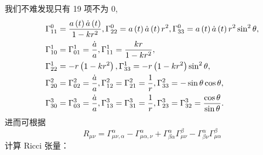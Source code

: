 \documentclass[../天体物理基础.tex]{subfiles}
\begin{document}
我们不难发现只有 19 项不为 0,
\begin{align}
\Gamma_{11}^{0}&=\frac{a\left(t\right)\dot{a}\left(t\right)}{1-kr^{2}},\Gamma_{22}^{0}=a\left(t\right)\dot{a}\left(t\right)r^{2},\Gamma_{33}^{0}=a\left(t\right)\dot{a}\left(t\right)r^{2}\sin^{2}\theta,\notag\\
\Gamma_{10}^{1}&=\Gamma_{01}^{1}=\frac{\dot a}{a},\Gamma_{11}^{1}=\frac{kr}{1-kr^{2}},\notag\\
\Gamma_{22}^{1}&=-r\left(1-kr^{2}\right),\Gamma_{33}^{1}=-r\left(1-kr^{2}\right)\sin^{2}\theta,\notag\\
\Gamma_{20}^{2}&=\Gamma_{02}^{2}=\frac{\dot a}{a},\Gamma_{12}^{2}=\Gamma_{21}^{2}=\frac{1}{r},\Gamma_{33}^{2}=-\sin\theta\cos\theta,\notag\\
\Gamma_{30}^{3}&=\Gamma_{03}^{3}=\frac{\dot a}{a},\Gamma_{13}^{3}=\Gamma_{31}^{3}=\frac{1}{r},\Gamma_{23}^{3}=\Gamma_{32}^{3}=\frac{\cos\theta}{\sin\theta}.\notag
\end{align}
进而可根据
\begin{equation}
R_{\mu\nu}=\Gamma_{\mu\nu,\alpha}^{\alpha}-\Gamma_{\mu\alpha,\nu}^{\alpha}+\Gamma_{\beta\alpha}^{\alpha}\Gamma_{\mu\nu}^{\beta}-\Gamma_{\beta\nu}^{\alpha}\Gamma_{\mu\alpha}^{\beta}
\end{equation}
计算 Ricci 张量：
\end{document}
